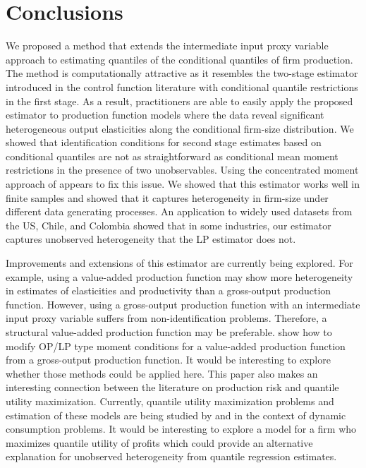 \documentclass[11pt]{article}
\begin{document}
\section{Conclusions} \label{conclusion}

We proposed a method that extends the intermediate input proxy variable approach to estimating quantiles of the conditional quantiles of firm production. The method is computationally attractive as it resembles the two-stage estimator introduced in the control function literature with conditional quantile restrictions in the first stage. As a result, practitioners are able to easily apply the proposed estimator to production function models where the data reveal significant heterogeneous output elasticities along the conditional firm-size distribution. We showed that identification conditions for second stage estimates based on conditional quantiles are not as straightforward as conditional mean moment restrictions in the presence of two unobservables. Using the concentrated moment approach of \cite{Ackerberg2015} appears to fix this issue.  We showed that this estimator works well in finite samples and showed that it captures heterogeneity in firm-size under different data generating processes. An application to widely used datasets from the US, Chile, and Colombia showed that in some industries, our estimator captures unobserved heterogeneity that the LP estimator does not.

Improvements and extensions of this estimator are currently being explored. For example, using a value-added production function may show more heterogeneity in estimates of elasticities and productivity than a gross-output production function. However, using a gross-output production function with an intermediate input proxy variable suffers from non-identification problems. Therefore, a structural value-added production function may be preferable. \cite{Kasahara2015} show how to modify OP/LP type moment conditions for a value-added production function from a gross-output production function. It would be interesting to explore whether those methods could be applied here. This paper also makes an interesting connection between the literature on production risk and quantile utility maximization. Currently, quantile utility maximization problems and estimation of these models are being studied by \cite{Castro2017} and \cite{qgmm} in the context of dynamic consumption problems. It would be interesting to explore a model for a firm who maximizes quantile utility of profits which could provide an alternative explanation for unobserved heterogeneity from quantile regression estimates.
\end{document}
